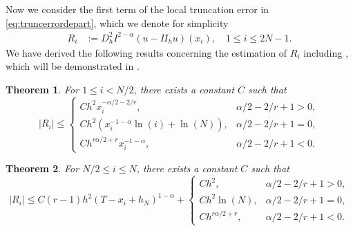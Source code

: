 \documentclass{amsart}
\newtheorem{theorem}{Theorem}[section]
\theoremstyle{definition}
\theoremstyle{remark}
\numberwithin{equation}{section}
\begin{document}
\label{subsec:Ri}

Now we consider the first term of the local truncation error in \eqref{eq:truncerrordepart}, which we denote for simplicity
\begin{equation} \label{eq:Ri}
  \begin{aligned}
    R_i & := D_h^2 I^{2-\alpha}(u-\Pi_h u)(x_i) , \quad 1\le i\le 2N-1 .
  \end{aligned}
\end{equation}
We have derived the following results concerning the estimation of $R_i$ including , which will be demonstrated  in .
  \begin{theorem} \label{thm:Ri-ilessN/2}
    For \(1\le i < N/2\), there exists a constant $C$ such that
    \begin{equation*}
      |R_i| \le \begin{cases}
        C h^2 x_i^{-\alpha/2-2/r} ,             & \alpha/2 - 2/r + 1 > 0, \\
        C h^2 (x_i^{-1-\alpha}\ln(i) + \ln(N)), & \alpha/2 - 2/r + 1 = 0, \\
        C h^{r\alpha/2+r} x_i^{-1-\alpha},        & \alpha/2 - 2/r + 1 < 0.
      \end{cases}
    \end{equation*}
  \end{theorem}
  \begin{theorem} \label{thm:Ri-N/2le-i-leN}
    For \(N/2 \le i\le N\), there exists a constant $C$ such that
    \begin{equation*}
      |R_i| \le C(r-1) h^2 (T-x_{i} + h_N)^{1-\alpha}  + \begin{cases}
        C h^2,             & \alpha/2-2/r+1 > 0, \\
        C h^2 \ln(N) ,     & \alpha/2-2/r+1 = 0, \\
        C h^{r\alpha/2+r}, & \alpha/2-2/r+1 < 0.
      \end{cases}
    \end{equation*}
  \end{theorem}
\end{document}

